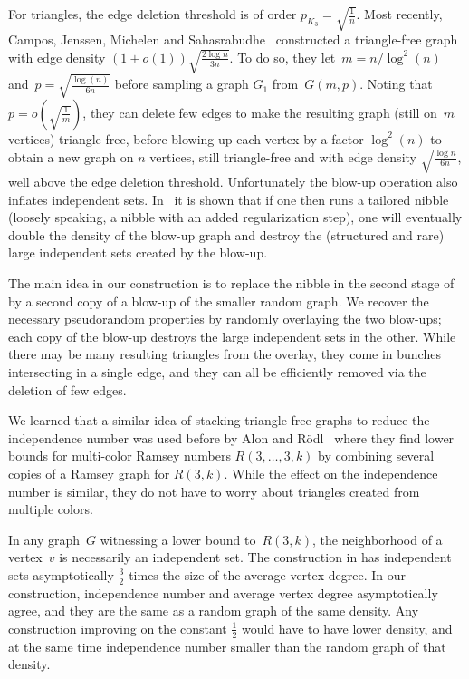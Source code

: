 \documentclass{article}
\begin{document}
For triangles, the edge deletion threshold is of order $p_{K_3}=\sqrt{\frac1n}$.
Most recently, Campos, Jenssen, Michelen and Sahasrabudhe~\cite{campos2025} constructed a triangle-free graph with edge density $(1+o(1))\sqrt{\frac{2\log n}{3n}}$. To do so, they let~${m}= n / \log^2(n)$ and~$p = \sqrt{\frac{\log(n)}{6 n}}$ before sampling a graph $G_1$ from~$G({m},p)$. Noting that~$ p = o\left(\sqrt{\frac1{{m}}}\right)$, they can delete few edges to make the resulting graph (still on~${m}$ vertices) triangle-free, before blowing up each vertex by a factor $\log^2(n)$ to obtain a new graph on $n$ vertices, still triangle-free and with edge density $\sqrt{\frac{\log{n}}{6n}}$, well above the edge deletion threshold.
Unfortunately the blow-up operation also inflates independent sets. In~\cite{campos2025} it is shown that if one then runs a tailored nibble (loosely speaking, a nibble with an added regularization step), one will eventually double the density of the blow-up graph and destroy the (structured and rare) large independent sets created by the blow-up. 

The main idea in our construction is to replace the nibble in the second stage of~\cite{campos2025} by a second copy of a blow-up of the smaller random graph. 
We recover the necessary pseudorandom properties by randomly overlaying the two blow-ups; each copy of the blow-up destroys the large independent sets in the other. While there may be many resulting triangles from the overlay, they come in bunches intersecting in a single edge, and they can all be efficiently removed via the deletion of few edges. 

We learned that a similar idea of stacking triangle-free graphs to reduce the independence number was used before by Alon and R\"odl~\cite{Alon05} where they find lower bounds for multi-color Ramsey numbers $R(3,\ldots,3,k)$ by combining several copies of a Ramsey graph for $R(3,k)$. While the effect on the independence number is similar, they do not have to worry about triangles created from multiple colors.


In any graph~$G$ witnessing a lower bound to~$R(3,k)$, the neighborhood of a vertex~$v$ is necessarily an independent set.
The construction in \cite{campos2025} has independent sets asymptotically $\frac32$ times the size of the average vertex degree.
In our construction, independence number and average vertex degree asymptotically agree, and they are the same as a random graph of the same density. Any construction improving on the constant $\frac12$ would have to have lower density, and at the same time independence number smaller than the random graph of that density.
\end{document}
